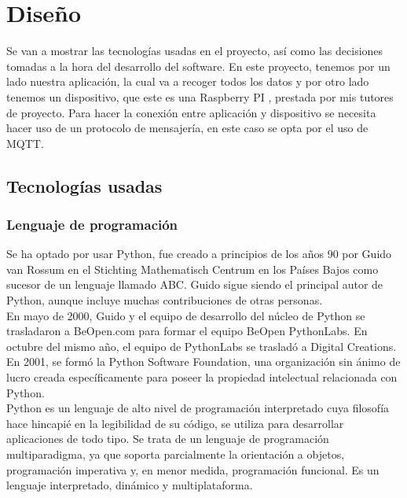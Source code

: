 \chapter{Diseño}

{\color{blue}


Se van a mostrar las tecnologías usadas en el proyecto, así como las decisiones tomadas a la hora del desarrollo del software. En este proyecto, tenemos por un lado nuestra aplicación, la cual va a recoger todos los datos y por otro lado tenemos un dispositivo, que este es una Raspberry PI \cite{raspberry-specs}, prestada por mis tutores de proyecto. Para hacer la conexión entre aplicación y dispositivo se necesita hacer uso de un protocolo de mensajería, en este caso se opta por el uso de MQTT.

\section{Tecnologías usadas}

\subsection{Lenguaje de programación}

Se ha optado por usar Python, fue creado a principios de los años 90 por Guido van Rossum en el Stichting Mathematisch Centrum en los Países Bajos como sucesor de un lenguaje llamado ABC. Guido sigue siendo el principal autor de Python, aunque incluye muchas contribuciones de otras personas. \\

En mayo de 2000, Guido y el equipo de desarrollo del núcleo de Python se trasladaron a BeOpen.com para formar el equipo BeOpen PythonLabs. En octubre del mismo año, el equipo de PythonLabs se trasladó a Digital Creations. En 2001, se formó la Python Software Foundation, una organización sin ánimo de lucro creada específicamente para poseer la propiedad intelectual relacionada con Python. \cite{python-history} \\

Python es un lenguaje de alto nivel de programación interpretado cuya filosofía hace hincapié en la legibilidad de su código, se utiliza para desarrollar aplicaciones de todo tipo. Se trata de un lenguaje de programación multiparadigma, ya que soporta parcialmente la orientación a objetos, programación imperativa y, en menor medida, programación funcional. Es un lenguaje interpretado, dinámico y multiplataforma. \cite{python-wiki} \\

}
